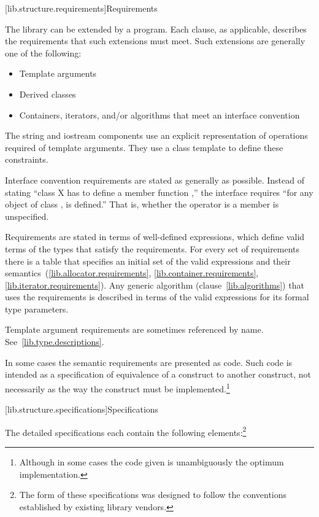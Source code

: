 [lib.structure.requirements]{Requirements}

\pnum
{}%
The library can be extended by a \Cpp program. Each clause, as applicable,
describes the requirements that such extensions must meet.
Such extensions are generally one of the following:

\begin{itemize}
\item Template arguments
\item Derived classes
\item Containers, iterators, and/or algorithms that meet an interface convention
\end{itemize}

\pnum
The string and iostream components use an explicit representation of operations
required of template arguments. They use a class template  to
define these constraints.

\pnum
Interface convention requirements are stated as generally as possible. Instead
of stating ``class X has to define a member function ,'' the
interface requires ``for any object  of class ,  is
defined.'' That is, whether the operator is a member is unspecified.

\pnum
Requirements are stated in terms of well-defined expressions, which define valid terms of
the types that satisfy the requirements. For every set of
requirements there is a table that specifies an initial set of the valid expressions and
their semantics~(\ref{lib.allocator.requirements}, \ref{lib.container.requirements},
\ref{lib.iterator.requirements}). Any generic algorithm (clause~\ref{lib.algorithms}) that uses the
requirements is described in terms of the valid expressions for
its formal type parameters.

\pnum
Template argument requirements are sometimes referenced by name.
See~\ref{lib.type.descriptions}.

\pnum
In some cases the semantic requirements are presented as \Cpp code.
Such code is intended as a
specification of equivalence of a construct to another construct, not
necessarily as the way the construct
must be implemented.\footnote{Although in some cases the code given is
unambiguously the optimum implementation.}

[lib.structure.specifications]{Specifications}

\pnum
The detailed specifications each contain the following elements:\footnote{The
form of these specifications was designed to follow the conventions
established by existing \Cpp library vendors.}%

